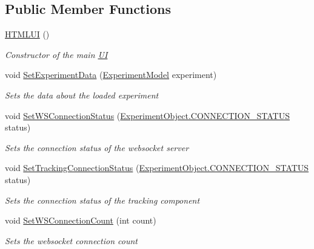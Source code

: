 \subsection*{Public Member Functions}
\begin{DoxyCompactItemize}
\item 
\hyperlink{class_web_analyzer_1_1_u_i_1_1_h_t_m_l_u_i_aaaa68b7c3f90ecdd0bf051d1661004a4}{H\+T\+M\+L\+U\+I} ()
\begin{DoxyCompactList}\small\item\em Constructor of the main \hyperlink{namespace_web_analyzer_1_1_u_i}{U\+I} \end{DoxyCompactList}\item 
void \hyperlink{class_web_analyzer_1_1_u_i_1_1_h_t_m_l_u_i_ac06665c3130dee5b5d7676b7ea5589d4}{Set\+Experiment\+Data} (\hyperlink{class_web_analyzer_1_1_models_1_1_base_1_1_experiment_model}{Experiment\+Model} experiment)
\begin{DoxyCompactList}\small\item\em Sets the data about the loaded experiment \end{DoxyCompactList}\item 
void \hyperlink{class_web_analyzer_1_1_u_i_1_1_h_t_m_l_u_i_aceec55dc8dd89be1fcbfa8a7184d3715}{Set\+W\+S\+Connection\+Status} (\hyperlink{class_web_analyzer_1_1_u_i_1_1_interaction_objects_1_1_experiment_object_a2875208b4f4b0ed643593152f4ec025c}{Experiment\+Object.\+C\+O\+N\+N\+E\+C\+T\+I\+O\+N\+\_\+\+S\+T\+A\+T\+U\+S} status)
\begin{DoxyCompactList}\small\item\em Sets the connection status of the websocket server \end{DoxyCompactList}\item 
void \hyperlink{class_web_analyzer_1_1_u_i_1_1_h_t_m_l_u_i_aa012cb8155f5ab3dfc93b564f8a76faa}{Set\+Tracking\+Connection\+Status} (\hyperlink{class_web_analyzer_1_1_u_i_1_1_interaction_objects_1_1_experiment_object_a2875208b4f4b0ed643593152f4ec025c}{Experiment\+Object.\+C\+O\+N\+N\+E\+C\+T\+I\+O\+N\+\_\+\+S\+T\+A\+T\+U\+S} status)
\begin{DoxyCompactList}\small\item\em Sets the connection status of the tracking component \end{DoxyCompactList}\item 
void \hyperlink{class_web_analyzer_1_1_u_i_1_1_h_t_m_l_u_i_a00b81504075fbc78a43776c2688b3ffd}{Set\+W\+S\+Connection\+Count} (int count)
\begin{DoxyCompactList}\small\item\em Sets the websocket connection count \end{DoxyCompactList}\item 

\end{DoxyCompactItemize}

